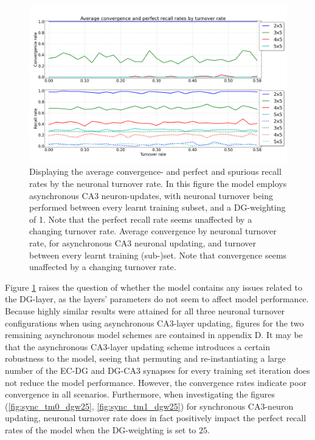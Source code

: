 \begin{figure}
    \centering
    \includegraphics[width=13cm]{fig/turnover_rates/async_tm0_dgw1}
    \caption{Displaying the average convergence- and perfect and spurious recall rates by the neuronal turnover rate. In this figure the model employs asynchronous CA3 neuron-updates, with neuronal turnover being performed between every learnt training subset, and a DG-weighting of 1. Note that the perfect recall rate seems unaffected by a changing turnover rate.
    Average convergence by neuronal turnover rate, for asynchronous CA3 neuronal updating, and turnover between every learnt training (sub-)set. Note that convergence seems unaffected by a changing turnover rate.}
    \label{fig:async_tm0_dgw1}
\end{figure}

Figure \ref{fig:async_tm0_dgw1} raises the question of whether the model contains any issues related to the DG-layer, as the layers' parameters do not seem to affect model performance. Because highly similar results were attained for all three neuronal turnover configurations when using asynchronous CA3-layer updating, figures for the two remaining asynchronous model schemes are contained in appendix D.
It may be that the asynchronous CA3-layer updating scheme introduces a certain robustness to the model, seeing that permuting and re-instantiating a large number of the EC-DG and DG-CA3 synapses for every training set iteration does not reduce the model performance. 
However, the convergence rates indicate poor convergence in all scenarios. Furthermore, when investigating the figures (\ref{fig:sync_tm0_dgw25}, \ref{fig:sync_tm1_dgw25}) for synchronous CA3-neuron updating, neuronal turnover rate does in fact positively impact the perfect recall rates of the model when the DG-weighting is set to $25$.

